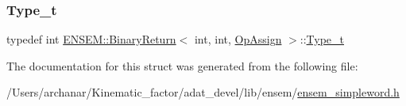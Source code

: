 \mbox{\label{structENSEM_1_1BinaryReturn_3_01int_00_01int_00_01OpAssign_01_4_a9190cc9e0398fc2b905dca61a8089bf3}} 
\subsubsection{\texorpdfstring{Type\_t}{Type\_t}\hspace{0.1cm}{\footnotesize\ttfamily [2/2]}}
{\footnotesize\ttfamily typedef int \mbox{\hyperlink{structENSEM_1_1BinaryReturn}{E\+N\+S\+E\+M\+::\+Binary\+Return}}$<$ int, int, \mbox{\hyperlink{structENSEM_1_1OpAssign}{Op\+Assign}} $>$\+::\mbox{\hyperlink{structENSEM_1_1BinaryReturn_3_01int_00_01int_00_01OpAssign_01_4_a9190cc9e0398fc2b905dca61a8089bf3}{Type\+\_\+t}}}



The documentation for this struct was generated from the following file\+:\begin{DoxyCompactItemize}
\item 
/\+Users/archanar/\+Kinematic\+\_\+factor/adat\+\_\+devel/lib/ensem/\mbox{\hyperlink{lib_2ensem_2ensem__simpleword_8h}{ensem\+\_\+simpleword.\+h}}\end{DoxyCompactItemize}
